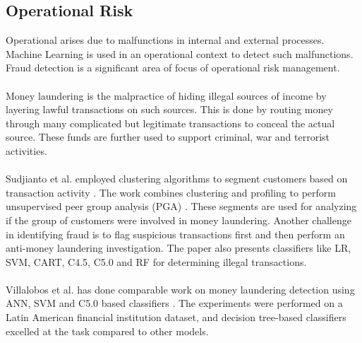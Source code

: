 \documentclass[a4paper, 12pt]{article}
\begin{document}
\vskip 0.2in
\subsection{Operational Risk}
\noindent Operational arises due to malfunctions in internal and external processes. Machine Learning is used in an operational context to detect such malfunctions. Fraud detection is a significant area of focus of operational risk management.
\\
\\
\noindent Money laundering is the malpractice of hiding illegal sources of income by layering lawful transactions on such sources. This is done by routing money through many complicated but legitimate transactions to conceal the actual source. These funds are further used to support criminal, war and terrorist activities.
\\
\\
\noindent Sudjianto et al. employed clustering algorithms to segment customers based on transaction activity \cite{sudjianto2010statistical}. The work combines clustering and profiling to perform unsupervised peer group analysis (PGA) \cite{bolton2001peer}. These segments are used for analyzing if the group of customers were involved in money laundering. Another challenge in identifying fraud is to flag suspicious transactions first and then perform an anti-money laundering investigation. The paper also presents classifiers like LR, SVM, CART, C4.5, C5.0 and RF for determining illegal transactions.
\\
\\
\noindent Villalobos et al. has done comparable work on money laundering detection using ANN, SVM and C5.0 based classifiers \cite{villalobos2017statistical}. The experiments were performed on a Latin American financial institution dataset, and decision tree-based classifiers excelled at the task compared to other models. 
\end{document}
